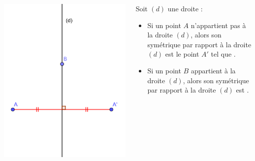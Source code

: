 \documentclass[xcolor={dvipsnames}]{beamer}
\begin{document}
\begin{frame}
	
	\begin{columns}
		\begin{column}{0.35\textwidth}
				\includegraphics[scale=0.18]{def}
		\end{column}
	
		\begin{column}{0.65\textwidth}
			\begin{myprops}
				Soit $(d)$ une droite :\pause
				\begin{itemize}
					\item Si un point $A$ n'appartient pas à la droite $(d)$, alors son symétrique par rapport à la droite $(d)$ est le point $A'$ tel que .\pause
					\item Si un point $B$ appartient à la droite $(d)$, alors son symétrique par rapport à la droite $(d)$ est .
				\end{itemize}
			\end{myprops}
		\end{column}
	\end{columns}
	
	
\end{frame}
\end{document}
